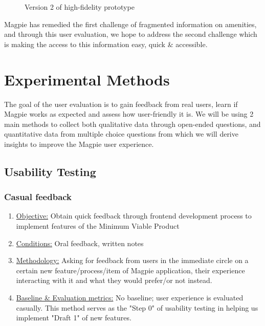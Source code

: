 \documentclass{report}
\begin{document}
\begin{figure}
\begin{minipage}{0.45\textwidth}
        \caption{Version 2 of high-fidelity prototype}
        \label{fig:plot8}
    \end{minipage}
\end{figure}

\noindent{}Magpie has remedied the first challenge of fragmented information on
amenities, and through this user evaluation, we hope to address the second challenge
which is making the access to this information easy, quick \& accessible.

\chapter{Experimental Methods}
The goal of the user evaluation is to gain feedback from real users, learn if
Magpie works as expected and assess how user-friendly it is. We will be using 2
main methods to collect both qualitative data through open-ended questions, and
quantitative data from multiple choice questions from which we will derive
insights to improve the Magpie user experience.
\section{Usability Testing}
\subsection{Casual feedback}
\begin{enumerate}
    \item \underline{Objective:} Obtain quick feedback through frontend development process to implement features of the Minimum Viable Product
    \item \underline{Conditions:} Oral feedback, written notes
    \item \underline{Methodology:} Asking for feedback from users in the immediate circle on a certain new feature/process/item of Magpie application, their experience interacting with it and what they would prefer/or not instead.
    \item \underline{Baseline \& Evaluation metrics:} No baseline; user experience is evaluated casually. This method serves as the "Step 0" of usability testing in helping us implement "Draft 1" of new features.
\end{enumerate}
\end{document}
